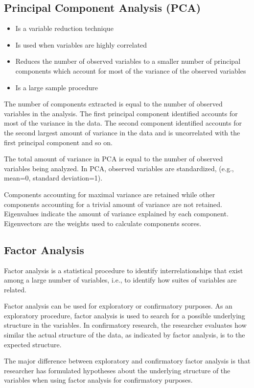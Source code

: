 \documentclass[a4paper,12pt]{article}
\begin{document}
\subsection{Principal Component Analysis (PCA)}
\begin{itemize}
\item Is a variable reduction technique
\item Is used when variables are highly correlated
\item Reduces the number of observed variables to a smaller number of principal components which account for most
of the variance of the observed variables
\item Is a large sample procedure
\end{itemize}

The number of components extracted is equal to the number of observed variables in the analysis. The first principal
component identified accounts for most of the variance in the data. The second component identified accounts for the
second largest amount of variance in the data and is uncorrelated with the first principal component and so on.


The total amount of variance in PCA is equal to the number of observed variables being analyzed. In PCA, observed
variables are standardized, (e.g., mean=0, standard deviation=1).

Components accounting for maximal variance are retained while other components accounting for a trivial amount of
variance are not retained. Eigenvalues indicate the amount of variance explained by each component. Eigenvectors
are the weights used to calculate components scores.


\subsection{Factor Analysis}
Factor analysis is a statistical procedure to identify interrelationships that
exist among a large number of variables, i.e.,  to identify how suites of
variables are related.

Factor analysis can be used for exploratory or confirmatory purposes.
As an exploratory procedure, factor analysis is used to search for a
possible underlying structure in the variables. In confirmatory research,
the researcher evaluates how similar the actual structure of the data, as
indicated by factor analysis, is to the expected structure.

The major difference between exploratory and confirmatory factor
analysis is that researcher has formulated hypotheses about the
underlying structure of the variables when using factor analysis for
confirmatory purposes.
\end{document}
